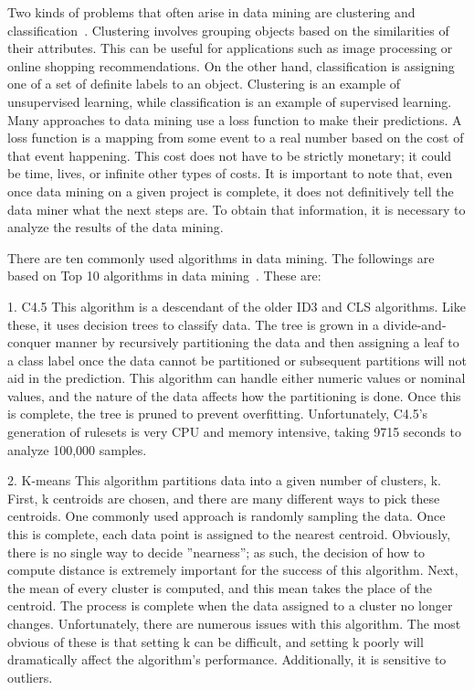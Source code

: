 Two kinds of problems that often arise in data mining are clustering
and classification~\cite{editor06}. Clustering involves grouping objects
based on the similarities of their attributes. This can be useful
for applications such as image processing or online shopping
recommendations. On the other hand, classification is assigning
one of a set of definite labels to an object. Clustering is
an example of unsupervised learning, while classification is
an example of supervised learning. Many approaches to data
mining use a loss function to make their predictions. A loss
function is a mapping from some event to a real number based
on the cost of that event happening. This cost does not have
to be strictly monetary; it could be time, lives, or infinite other
types of costs. It is important to note that, even once data
mining on a given project is complete, it does not definitively
tell the data miner what the next steps are. To obtain that
information, it is necessary to analyze the results of the data
mining.

There are ten commonly used algorithms in data mining.
The followings are based on Top 10 algorithms in data mining~\cite{editor07}.
These are:

1. C4.5  This algorithm is a descendant of the older ID3 and CLS algorithms.
Like these, it uses decision trees to classify data. The
tree is grown in a divide-and-conquer manner by recursively
partitioning the data and then assigning a leaf to a class label
once the data cannot be partitioned or subsequent partitions
will not aid in the prediction. This algorithm can handle either
numeric values or nominal values, and the nature of the data
affects how the partitioning is done. Once this is complete,
the tree is pruned to prevent overfitting. Unfortunately, C4.5’s
generation of rulesets is very CPU and memory intensive,
taking 9715 seconds to analyze 100,000 samples.

2. K-means  This algorithm partitions data into a given number of clusters,
k. First, k centroids are chosen, and there are many different
ways to pick these centroids. One commonly used approach
is randomly sampling the data. Once this is complete, each
data point is assigned to the nearest centroid. Obviously, there
is no single way to decide ”nearness”; as such, the decision
of how to compute distance is extremely important for the
success of this algorithm. Next, the mean of every cluster
is computed, and this mean takes the place of the centroid.
The process is complete when the data assigned to a cluster
no longer changes. Unfortunately, there are numerous issues
with this algorithm. The most obvious of these is that setting
k can be difficult, and setting k poorly will dramatically affect
the algorithm’s performance. Additionally, it is sensitive to
outliers.

